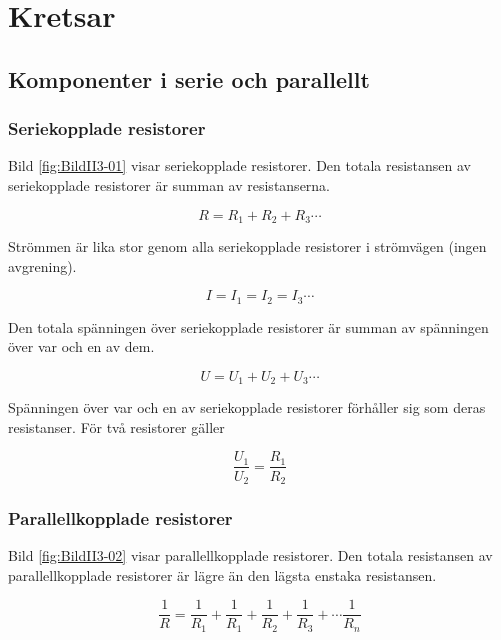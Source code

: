 \chapter{Kretsar}

\section[Serie och parallellt]{Komponenter i serie och parallellt}

\subsection{Seriekopplade resistorer}


Bild \ref{fig:BildII3-01} visar seriekopplade resistorer.
Den totala resistansen av seriekopplade resistorer är summan av resistanserna.

\[R = R_1 + R_2 + R_3 \cdots \]

Strömmen är lika stor genom alla seriekopplade resistorer i strömvägen (ingen
avgrening).

\[I = I_1 = I_2 = I_3 \cdots \]

Den totala spänningen över seriekopplade resistorer är summan av spänningen över
var och en av dem.

\[U = U_1 + U_2 + U_3 \cdots \]

Spänningen över var och en av seriekopplade resistorer förhåller sig som deras
resistanser. För två resistorer gäller

\[\dfrac{U_1}{U_2} = \dfrac{R_1}{R_2}\]


\subsection{Parallellkopplade resistorer}


Bild \ref{fig:BildII3-02} visar parallellkopplade resistorer.
Den totala resistansen av parallellkopplade resistorer är lägre än den lägsta
enstaka resistansen.

\[
\frac{1}{R} = \frac{1}{R_1} + \frac{1}{R_1} +
\frac{1}{R_2} + \frac{1}{R_3} + \cdots \frac{1}{R_n}
\]

